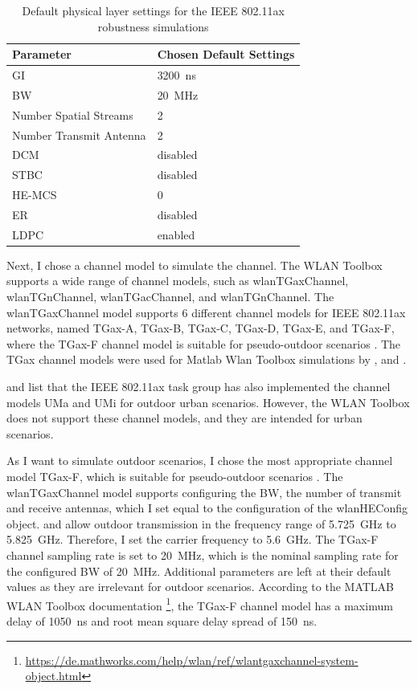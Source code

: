 \begin{table}
   \centering
   \begin{tabular}{>{\raggedright}p{4.5cm}p{4.5cm}}
      \toprule
      Parameter & Chosen Default Settings \\
      \midrule
      \ac{GI} & \SI{3200}{\nano\second} \\
      \ac{BW} & \SI{20}{\mega\hertz} \\
      Number Spatial Streams & \num{2}\\
      Number Transmit Antenna & \num{2} \\
      \ac{DCM} & disabled \\
      \ac{STBC} & disabled \\
      \ac{HE}-\ac{MCS} & \num{0} \\
      \ac{ER} & disabled \\
      \ac{LDPC} & enabled \\
      \bottomrule
   \end{tabular}
   \caption{Default physical layer settings for the IEEE 802.11ax robustness simulations}
   \label{tab:robustnessDefaultSettings}
\end{table}

Next, I chose a channel model to simulate the channel.
The WLAN Toolbox supports a wide range of channel models, such as wlanTGaxChannel, wlanTGnChannel, wlanTGacChannel, and wlanTGnChannel.
The wlanTGaxChannel model supports \num{6} different channel models for IEEE 802.11ax networks, named TGax-A, TGax-B, TGax-C, TGax-D, TGax-E, and TGax-F,
where the TGax-F channel model is suitable for pseudo-outdoor scenarios \cite{TGAXCHANNEL}.
The TGax channel models were used for Matlab Wlan Toolbox simulations by \cite{s_performance_2022}, \cite{cao_efficient_2022} and \cite{jin_efficient_2021}.

\cite{TGAXCHANNEL} and \cite{omar_survey_2016} list that the IEEE 802.11ax task group has also implemented the channel models UMa and UMi for outdoor urban scenarios.
However, the WLAN Toolbox does not support these channel models, and they are intended for urban scenarios.



As I want to simulate outdoor scenarios, I chose the most appropriate channel model TGax-F, which is suitable for pseudo-outdoor scenarios \cite{TGAXCHANNEL}.
The wlanTGaxChannel model supports configuring the \ac{BW}, the number of transmit and receive antennas, which I set equal to the configuration of the wlanHEConfig object.
\cite{freq_plan_24G} and \cite{freq_plan_5G} allow outdoor transmission in the frequency range of \SI{5.725}{\giga\hertz} to \SI{5.825}{\giga\hertz}.
Therefore, I set the carrier frequency to \SI{5.6}{\giga\hertz}.
The TGax-F channel sampling rate is set to \SI{20}{\mega\hertz}, which is the nominal sampling rate for the configured \ac{BW} of \SI{20}{\mega\hertz}.
Additional parameters are left at their default values as they are irrelevant for outdoor scenarios.
According to the MATLAB WLAN Toolbox documentation \footnote{\url{https://de.mathworks.com/help/wlan/ref/wlantgaxchannel-system-object.html}},
the TGax-F channel model has a maximum delay of \SI{1050}{\nano\second} and root mean square delay spread of \SI{150}{\nano\second}.

